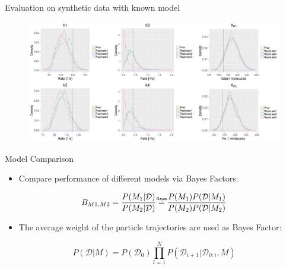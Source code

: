 \documentclass[pdf]
{beamer}
\newcommand\bayeseq{\mathrel{\overset{\makebox[0pt]{\mbox{\normalfont\tiny\sffamily Bayes}}}{=}}}
\begin{document}
\begin{frame}{Evaluation on synthetic data with known model}

	\begin{figure}[ht]
		\begin{center}
			\includegraphics[height=2.1in]{figures/test_vertical2.PNG}
		\end{center}
	\end{figure}
\end{frame}

\begin{frame}{Model Comparison}
	\begin{itemize}
		\item Compare performance of different models via Bayes Factors:
	\end{itemize}
	
	\begin{equation}
		B_{M1, M2} = \frac{P(M_1 | \mathcal{D})}{P(M_2 | \mathcal{D})}  \bayeseq \frac{P(M_1) P(\mathcal{D}| M_1)}{P(M_2) P(\mathcal{D} | M_2)} \label{eq:6}
	\end{equation}

	\begin{itemize}
		\item The average weight of the particle trajectories are used as Bayes Factor:
	\end{itemize}

	\begin{equation}
	P(\mathcal{D} | M) = P(\mathcal{D_0}) \prod_{l=1}^{N} P(\mathcal{D}_{i+1} | \mathcal{D}_{0:i}, M)\label{eq:7}
	\end{equation}

\end{frame}
\end{document}
